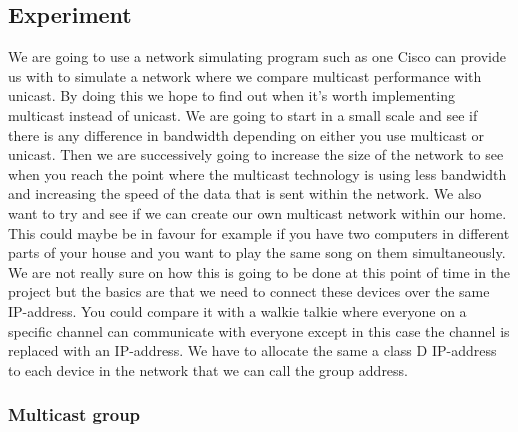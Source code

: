 \documentclass[9pt,a4paper]{acmproc}
\begin{document}
\subsection{Experiment}

We are going to use a network simulating program such as one Cisco can provide us with to simulate a network where we compare multicast performance with unicast. By doing this we hope to find out when it's worth implementing multicast instead of unicast. We are going to start in a small scale and see if there is any difference in bandwidth depending on either you use multicast or unicast. Then we are successively going to increase the size of the network to see when you reach the point where the multicast technology is using less bandwidth and increasing the speed of the data that is sent within the network.
We also want to try and see if we can create our own multicast network within our home. This could maybe be in favour for example if you have two computers in different parts of your house and you want to play the same song on them simultaneously. We are not really sure on how this is going to be done at this point of time in the project but the basics are that we need to connect these devices over the same IP-address. You could compare it with a walkie talkie where everyone on a specific channel can communicate with everyone except in this case the channel is replaced with an IP-address. We have to allocate the same a class D IP-address to each device in the network that we can call the group address.

\subsubsection{Multicast group}
\end{document}
